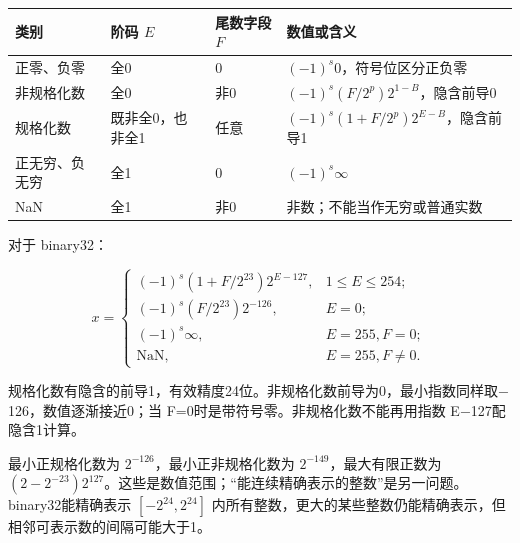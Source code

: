 \begin{wideblock}\par\medskip\noindent\begin{minipage}{\linewidth}\fontsize{9.3}{12}\selectfont\begin{tabularx}{\linewidth}{@{}YYYY@{}}
\toprule\noalign{}
\begin{minipage}[b]{\linewidth}\raggedright
类别
\end{minipage} & \begin{minipage}[b]{\linewidth}\raggedright
阶码 \(E\)
\end{minipage} & \begin{minipage}[b]{\linewidth}\raggedright
尾数字段 \(F\)
\end{minipage} & \begin{minipage}[b]{\linewidth}\raggedright
数值或含义
\end{minipage} \\
\midrule\noalign{}


正零、负零 & 全0 & 0 & \((-1)^s0\)，符号位区分正负零 \\
非规格化数 & 全0 & 非0 & \((-1)^s(F/2^p)2^{1-B}\)，隐含前导0 \\
规格化数 & 既非全0，也非全1 & 任意 & \((-1)^s(1+F/2^p)2^{E-B}\)，隐含前导1 \\
正无穷、负无穷 & 全1 & 0 & \((-1)^s\infty\) \\
NaN & 全1 & 非0 & 非数；不能当作无穷或普通实数 \\
\bottomrule\end{tabularx}
\end{minipage}\par\medskip\end{wideblock}

对于 binary32：

\[
x=\begin{cases}
(-1)^s(1+F/2^{23})2^{E-127},&1\le E\le254;\\
(-1)^s(F/2^{23})2^{-126},&E=0;\\
(-1)^s\infty,&E=255,F=0;\\
\mathrm{NaN},&E=255,F\ne0.
\end{cases}
\]

规格化数有隐含的前导1，有效精度24位。非规格化数前导为0，最小指数同样取\ensuremath{-}126，数值逐渐接近0；当 F=0时是带符号零。非规格化数不能再用指数 E\ensuremath{-}127配隐含1计算。

最小正规格化数为 \(2^{-126}\)，最小正非规格化数为 \(2^{-149}\)，最大有限正数为 \((2-2^{-23})2^{127}\)。这些是数值范围；``能连续精确表示的整数''是另一问题。binary32能精确表示 \([-2^{24},2^{24}]\) 内所有整数，更大的某些整数仍能精确表示，但相邻可表示数的间隔可能大于1。

